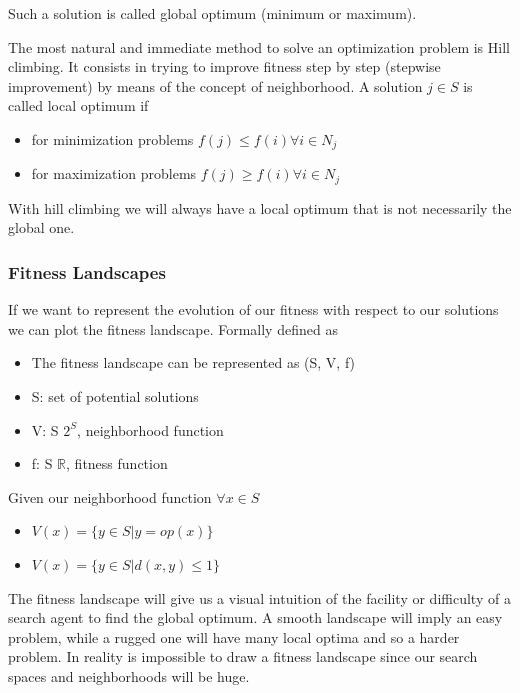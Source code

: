 Such a solution is called global optimum (minimum or maximum).

\vspace{10pt}

The most natural and immediate method to solve an optimization problem is Hill climbing. It consists in trying to improve fitness step by step (stepwise improvement) by means of the concept of neighborhood. A solution $j \in S$ is called local optimum if

\begin{itemize}
    \item for minimization problems $f(j) \leq f(i) \forall i \in N_j$
    \item for maximization problems $f(j) \geq f(i) \forall i \in N_j$
\end{itemize}

With hill climbing we will always have a local optimum that is not necessarily the global one. 


\subsubsection{Fitness Landscapes}

If we want to represent the evolution of our fitness with respect to our solutions we can plot the fitness landscape. Formally defined as

\begin{itemize}
    \item The fitness landscape can be represented as (S, V, f)
    \item S: set of potential solutions
    \item V: S \ra $2^S$, neighborhood function
    \item f: S \ra $\mathbb{R}$, fitness function
\end{itemize}

Given our neighborhood function $ \forall x \in S$

\begin{itemize}
    \item $V(x) = \{y \in S | y = op(x) \}$
    \item $V(x) = \{y \in S | d(x, y) \leq 1 \}$
\end{itemize}

The fitness landscape will give us a visual intuition of the facility or difficulty of a search agent to find the global optimum. A smooth landscape will imply an easy problem, while a rugged one will have many local optima and so a harder problem. In reality is impossible to draw a fitness landscape since our search spaces and neighborhoods will be huge. 

